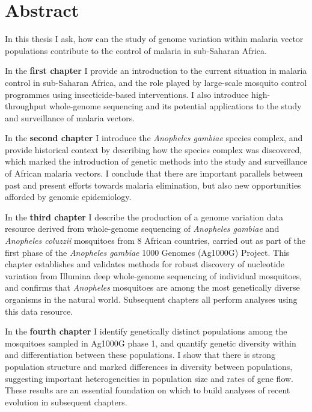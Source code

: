 \chapter*{Abstract}


In this thesis I ask, how can the study of genome variation within malaria vector populations contribute to the control of malaria in sub-Saharan Africa.


In the \textbf{first chapter} I provide an introduction to the current situation in malaria control in sub-Saharan Africa, and the role played by large-scale mosquito control programmes using insecticide-based interventions.
%
I also introduce high-throughput whole-genome sequencing and its potential applications to the study and surveillance of malaria vectors.


In the \textbf{second chapter} I introduce the \textit{Anopheles gambiae} species complex, and provide historical context by describing how the species complex was discovered, which marked the introduction of genetic methods into the study and surveillance of African malaria vectors.
%
I conclude that there are important parallels between past and present efforts towards malaria elimination, but also new opportunities afforded by genomic epidemiology.


In the \textbf{third chapter} I describe the production of a genome variation data resource derived from whole-genome sequencing of \textit{Anopheles gambiae} and \textit{Anopheles coluzzii} mosquitoes from 8 African countries, carried out as part of the first phase of the \textit{Anopheles gambiae} 1000 Genomes (Ag1000G) Project.
%
This chapter establishes and validates methods for robust discovery of nucleotide variation from Illumina deep whole-genome sequencing of individual mosquitoes, and confirms that \textit{Anopheles} mosquitoes are among the most genetically diverse organisms in the natural world.
%
Subsequent chapters all perform analyses using this data resource.


In the \textbf{fourth chapter} I identify genetically distinct populations among the mosquitoes sampled in Ag1000G phase 1, and quantify genetic diversity within and differentiation between these populations.
%
I show that there is strong population structure and marked differences in diversity between populations, suggesting important heterogeneities in population size and rates of gene flow.
%
These results are an essential foundation on which to build analyses of recent evolution in subsequent chapters.


